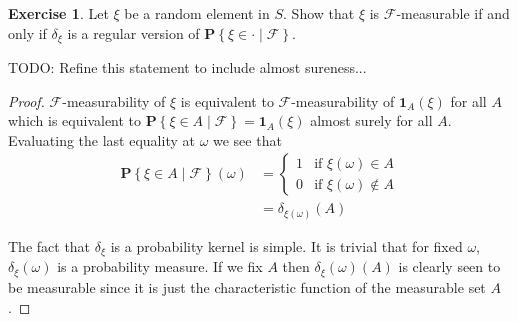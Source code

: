 \documentclass{amsbook}
\theoremstyle{definition}
\newtheorem{xca}{Exercise}
\theoremstyle{remark}
\newcommand{\cprobability}[2]{\textbf{P} \left \{#2 \mid #1 \right \}}
\newcommand{\characteristic}[1]{\textbf{1}_{#1}}
\begin{document}
\begin{xca}Let $\xi$ be a random element in $S$.  Show that $\xi$ is
  $\mathcal{F}$-measurable if and only if $\delta_\xi$ is a regular
  version of 
  $\cprobability{\mathcal{F}}{\xi \in \cdot}$.

TODO: Refine this statement to include almost sureness...
\end{xca}
\begin{proof}
$\mathcal{F}$-measurability of $\xi$ is equivalent to
$\mathcal{F}$-measurability of $\characteristic{A}(\xi)$ for all $A$
which is equivalent to $\cprobability{\mathcal{F}}{\xi \in A} =
\characteristic{A}(\xi)$ almost surely for all $A$.  Evaluating the
last equality at $\omega$ we see that 
\begin{align*}
\cprobability{\mathcal{F}}{\xi \in A}(\omega) &= \begin{cases}
1 & \text{if $\xi(\omega) \in A$} \\
0 & \text{if $\xi(\omega) \notin A$} 
\end{cases}\\
&= \delta_{\xi(\omega)}(A)
\end{align*}

The fact that $\delta_\xi$ is a probability kernel is simple.  It is
trivial that for fixed $\omega$, $\delta_\xi(\omega)$ is a probability
measure.  If we fix $A$ then $\delta_\xi(\omega)(A)$ is clearly seen
to be measurable since it is just the characteristic function of the
measurable set $A$.
\end{proof}
\end{document}
